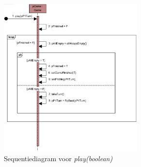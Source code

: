 \begin{landscape}
	\newpage
	\thispagestyle{empty}
	\begin{figure}
		\begin{subfigure}{\textwidth}
			\includegraphics[width=0.8\textwidth]{chap-evaluatie/play.png}
			\caption{Sequentiediagram voor \textit{play(boolean)}}
			\label{fig:nim-play}
		\end{subfigure}%
		\begin{subfigure}{\textwidth}

\end{subfigure}
\end{figure}
\end{landscape}
